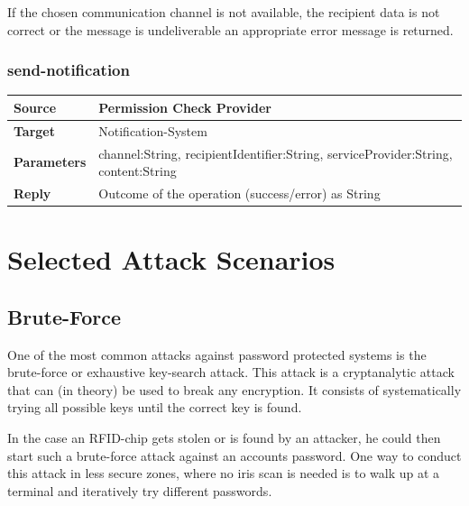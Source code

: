 \documentclass[12pt,a4paper,titlepage,oneside]{scrartcl}
\begin{document}
If the chosen communication channel is not available, the recipient data is not correct or the message is undeliverable an appropriate error message is returned.

\subsubsection{send-notification}

\begin{table}[h]

    \centering

    \begin{tabular}{|l|p{12cm}|} \hline

    \textbf{Source}&Permission Check Provider\\ \hline

    \textbf{Target}&Notification-System\\ \hline

    \textbf{Parameters}&channel:String, recipientIdentifier:String, serviceProvider:String, content:String\\ \hline

    \textbf{Reply}&Outcome of the operation (success/error) as String\\ \hline

    \end{tabular}

\end{table}

\section{Selected Attack Scenarios}
\subsection{Brute-Force}

One of the most common attacks against password protected systems is the brute-force or exhaustive key-search attack. This attack is a cryptanalytic attack that can (in theory) be used to break any encryption. It consists of systematically trying all possible keys until the correct key is found.

In the case an RFID-chip gets stolen or is found by an attacker, he could then start such a brute-force attack against an accounts password. One way to conduct this attack in less secure zones, where no iris scan is needed is to walk up at a terminal and iteratively try different passwords.
\end{document}
